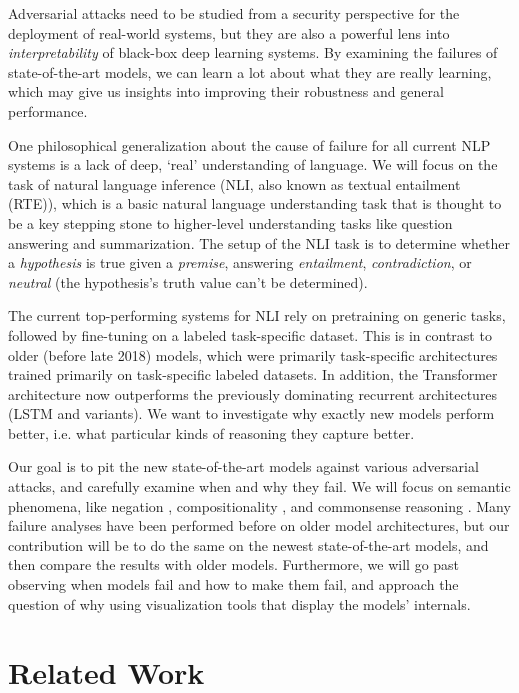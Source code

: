 \documentclass[letterpaper]{article}
\begin{document}
Adversarial attacks need to be studied from a security perspective for the deployment of real-world systems, but they are also a powerful lens into \emph{interpretability} of black-box deep learning systems.
By examining the failures of state-of-the-art models, we can learn a lot about what they are really learning, which may give us insights into improving their robustness and general performance.

One philosophical generalization about the cause of failure for all current NLP systems is a lack of deep, `real' understanding of language.
We will focus on the task of natural language inference (NLI, also known as textual entailment (RTE)), which is a basic natural language understanding task that is thought to be a key stepping stone to higher-level understanding tasks like question answering and summarization.
The setup of the NLI task is to determine whether a \emph{hypothesis} is true given a \emph{premise}, answering \emph{entailment}, \emph{contradiction}, or \emph{neutral} (the hypothesis's truth value can't be determined).

The current top-performing systems for NLI rely on pretraining on generic tasks, followed by fine-tuning on a labeled task-specific dataset.
This is in contrast to older (before late 2018) models, which were primarily task-specific architectures trained primarily on task-specific labeled datasets.
In addition, the Transformer architecture \cite{vaswani_attention_2017} now outperforms the previously dominating recurrent architectures (LSTM and variants).
We want to investigate why exactly new models perform better, i.e. what particular kinds of reasoning they capture better.

Our goal is to pit the new state-of-the-art models against various adversarial attacks, and carefully examine when and why they fail.
We will focus on semantic phenomena, like negation \cite{kang_adventure:_2018}, compositionality \cite{nie_analyzing_2018}, and commonsense reasoning \cite{glockner_breaking_2018}.
Many failure analyses have been performed before on older model architectures, but our contribution will be to do the same on the newest state-of-the-art models, and then compare the results with older models.
Furthermore, we will go past observing when models fail and how to make them fail, and approach the question of why using visualization tools that display the models' internals.





\section{Related Work}
\end{document}
